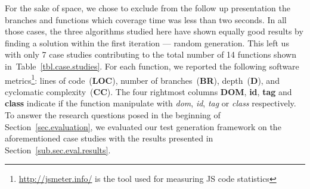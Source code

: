 \documentclass[sigconf,review,anonymous]{acmart}
\begin{document}
For the sake of space, we chose to exclude from the follow up presentation the branches and functions which coverage time was less than two seconds. In all those cases, the three algorithms studied here have shown equally good results by finding a solution within the first iteration --- random generation. This left us with only 7 case studies contributing to the total number of 14 functions  shown in~Table~\ref{tbl.case.studies}. For each function, we reported the following software metrics\footnote{\url{http://jsmeter.info/} is the tool used for measuring JS code statistics}: lines of code~(\textbf{LOC}), number of branches~(\textbf{BR}), depth~(\textbf{D}), and cyclomatic complexity~(\textbf{CC}). The four rightmost columns \textbf{DOM}, \textbf{id}, \textbf{tag} and \textbf{class} indicate if the function manipulate with \emph{dom}, \emph{id}, \emph{tag} or \emph{class} respectively. To answer the research questions posed in the beginning of Section~\ref{sec.evaluation}, we evaluated our test generation framework on the aforementioned case studies with the results presented in Section~\ref{sub.sec.eval.results}.
 
\end{document}
